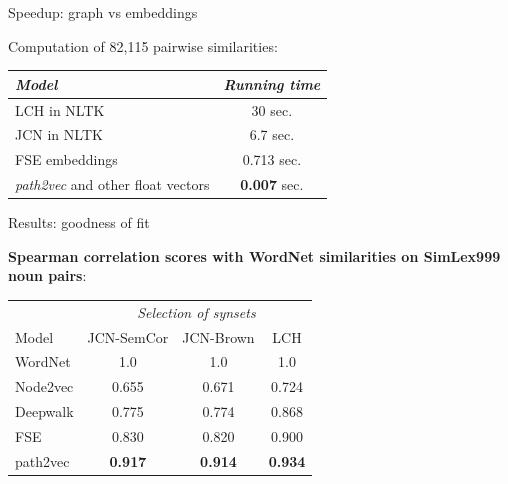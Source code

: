 \begin{frame}{Speedup: graph vs embeddings}	

Computation of 82,115 pairwise similarities:

\begin{table}
\begin{tabular}{lc}
\toprule
\textit{Model} & \textit{Running time} \\
\midrule
LCH in NLTK & 30 sec. \\
JCN in NLTK & 6.7 sec. \\
FSE embeddings & 0.713 sec. \\
\textit{path2vec} and other float vectors & \textbf{0.007} sec. \\
\bottomrule
\end{tabular}
\end{table}

\end{frame}


\begin{frame}{Results: goodness of fit}


\textbf{Spearman correlation scores with WordNet similarities on SimLex999 noun pairs}:

\begin{table}
\begin{tabular}{lccc}
\toprule
& \multicolumn{3}{c}{\textit{Selection of synsets}} \\
Model & JCN-SemCor & JCN-Brown & LCH \\
\midrule
WordNet & 1.0  & 1.0  & 1.0  \\
\midrule
Node2vec & 0.655 & 0.671 & 0.724  \\
Deepwalk & 0.775 & 0.774  & 0.868 \\
FSE & 0.830  & 0.820 & 0.900  \\
\midrule
path2vec & \textbf{0.917}  & \textbf{0.914}  & \textbf{0.934}  \\
\bottomrule
\end{tabular}
\end{table}

\end{frame}





